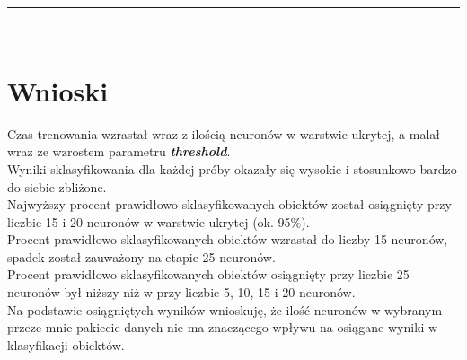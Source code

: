 \documentclass[a4paper,12pt]{article}
\newcommand{\linia}{\rule{\linewidth}{0.5pt}}
\theoremstyle{mytheor}
\begin{document}
\linia\\

\section*{Wnioski}
Czas trenowania wzrastał wraz z ilością neuronów w warstwie ukrytej, a malał wraz ze wzrostem parametru \textbf{\emph{threshold}}.\\

Wyniki sklasyfikowania dla każdej próby okazały się wysokie i stosunkowo bardzo do siebie zbliżone.\\

Najwyższy procent prawidłowo sklasyfikowanych obiektów został osiągnięty przy liczbie 15 i 20 neuronów w warstwie ukrytej (ok. 95\%).\\

Procent prawidłowo sklasyfikowanych obiektów wzrastał do liczby 15 neuronów, spadek został zauważony na etapie 25 neuronów.\\

Procent prawidłowo sklasyfikowanych obiektów osiągnięty przy liczbie 25 neuronów był niższy niż w przy liczbie 5, 10, 15 i 20 neuronów.\\

Na podstawie osiągniętych wyników wnioskuję, że ilość neuronów w wybranym przeze mnie pakiecie danych nie ma znaczącego wpływu na osiągane wyniki w klasyfikacji obiektów.
\end{document}
